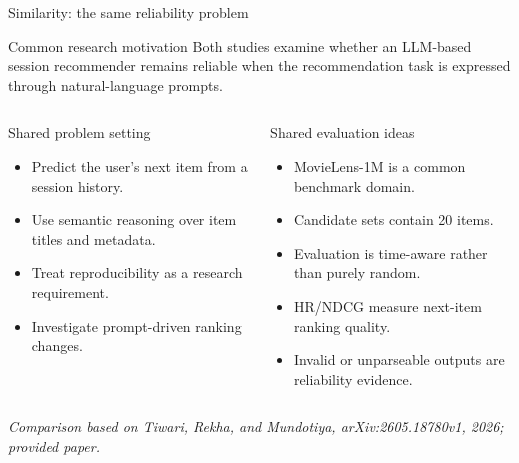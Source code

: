 \documentclass[aspectratio=169,12pt]{beamer}
\newcommand{\source}[1]{\vspace{0.35em}\par{\tiny\color{Muted}\textit{#1}}}
\begin{document}
\begin{frame}{Similarity: the same reliability problem}
\begin{alertblock}{Common research motivation}
Both studies examine whether an LLM-based session recommender remains reliable
when the recommendation task is expressed through natural-language prompts.
\end{alertblock}

\begin{columns}[T]
\begin{exampleblock}{Shared problem setting}
\begin{itemize}
  \item Predict the user's next item from a session history.
  \item Use semantic reasoning over item titles and metadata.
  \item Treat reproducibility as a research requirement.
  \item Investigate prompt-driven ranking changes.
\end{itemize}
\end{exampleblock}

\begin{block}{Shared evaluation ideas}
\begin{itemize}
  \item MovieLens-1M is a common benchmark domain.
  \item Candidate sets contain 20 items.
  \item Evaluation is time-aware rather than purely random.
  \item HR/NDCG measure next-item ranking quality.
  \item Invalid or unparseable outputs are reliability evidence.
\end{itemize}
\end{block}
\end{columns}

\source{Comparison based on Tiwari, Rekha, and Mundotiya, arXiv:2605.18780v1, 2026; provided paper.}
\end{frame}
\end{document}
